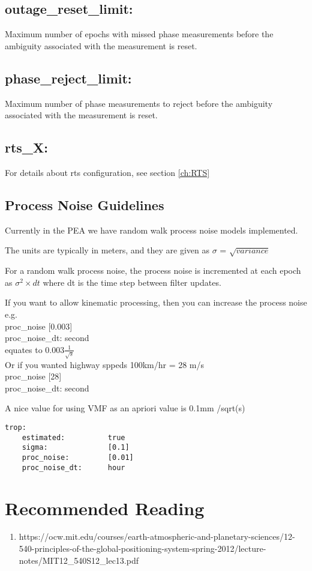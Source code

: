 \subsection{outage\_reset\_limit:}
Maximum number of epochs with missed phase measurements before the ambiguity associated with the measurement is reset.

\subsection{phase\_reject\_limit:}
Maximum number of phase measurements to reject before the ambiguity associated with the measurement is reset.


\subsection*{rts\_X:}

For details about rts configuration, see section \ref{ch:RTS}







\subsection{Process Noise Guidelines}

Currently in the PEA we have random walk process noise models implemented.

The units are typically in meters, and they are given as $\sigma$ = $\sqrt{variance}$

For a random walk process noise, the process noise is incremented at each epoch as $\sigma^2\times dt$ where dt is the time step between filter updates.

If you want to allow kinematic processing, then you can increase the process noise e.g.\\
proc\_noise [0.003]\\
proc\_noise\_dt: second\\ 

equates to $0.003\frac{1}{\sqrt{s}}$
\\ 
Or if you wanted highway sppeds 100km/hr = 28 m/s\\
proc\_noise [28]\\
proc\_noise\_dt: second

A nice value for using VMF as an apriori value is 0.1mm /sqrt(s)
%
\begin{lstlisting}
trop:
    estimated:          true
    sigma:              [0.1]
    proc_noise:         [0.01]
    proc_noise_dt:      hour
\end{lstlisting}



\section{Recommended Reading}

\begin{enumerate}
    \item https://ocw.mit.edu/courses/earth-atmospheric-and-planetary-sciences/12-540-principles-of-the-global-positioning-system-spring-2012/lecture-notes/MIT12\_540S12\_lec13.pdf
\end{enumerate}






